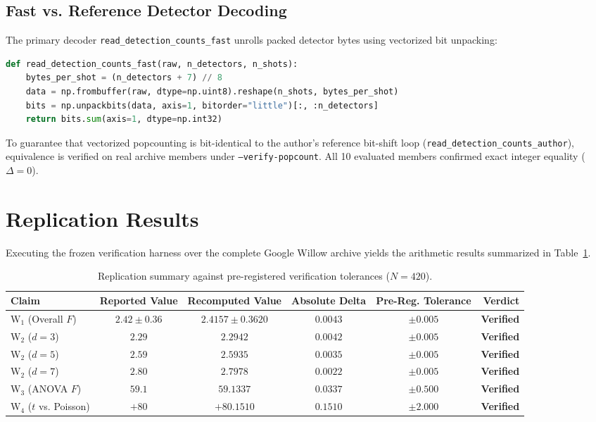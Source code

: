 \documentclass[10pt,a4paper,onecolumn]{article}
\begin{document}
\subsection{Fast vs. Reference Detector Decoding}
The primary decoder \texttt{read\_detection\_counts\_fast} unrolls packed detector bytes using vectorized bit unpacking:
\begin{lstlisting}[language=Python,basicstyle=\ttfamily\footnotesize]
def read_detection_counts_fast(raw, n_detectors, n_shots):
    bytes_per_shot = (n_detectors + 7) // 8
    data = np.frombuffer(raw, dtype=np.uint8).reshape(n_shots, bytes_per_shot)
    bits = np.unpackbits(data, axis=1, bitorder="little")[:, :n_detectors]
    return bits.sum(axis=1, dtype=np.int32)
\end{lstlisting}
To guarantee that vectorized popcounting is bit-identical to the author's reference bit-shift loop (\texttt{read\_detection\_counts\_author}), equivalence is verified on real archive members under \texttt{--verify-popcount}. All 10 evaluated members confirmed exact integer equality ($\Delta = 0$).

\section{Replication Results}

Executing the frozen verification harness over the complete Google Willow archive yields the arithmetic results summarized in Table~\ref{tab:results}.

\begin{table}[htbp]
\centering
\small
\begin{tabular}{lccccr}
\toprule
\textbf{Claim} & \textbf{Reported Value} & \textbf{Recomputed Value} & \textbf{Absolute Delta} & \textbf{Pre-Reg. Tolerance} & \textbf{Verdict} \\
\midrule
$\text{W}_1$ (Overall $F$) & $2.42 \pm 0.36$ & $2.4157 \pm 0.3620$ & $0.0043$ & $\pm 0.005$ & \textbf{Verified} \\
$\text{W}_2$ ($d=3$) & $2.29$ & $2.2942$ & $0.0042$ & $\pm 0.005$ & \textbf{Verified} \\
$\text{W}_2$ ($d=5$) & $2.59$ & $2.5935$ & $0.0035$ & $\pm 0.005$ & \textbf{Verified} \\
$\text{W}_2$ ($d=7$) & $2.80$ & $2.7978$ & $0.0022$ & $\pm 0.005$ & \textbf{Verified} \\
$\text{W}_3$ (ANOVA $F$) & $59.1$ & $59.1337$ & $0.0337$ & $\pm 0.500$ & \textbf{Verified} \\
$\text{W}_4$ ($t$ vs. Poisson) & $+80$ & $+80.1510$ & $0.1510$ & $\pm 2.000$ & \textbf{Verified} \\
\bottomrule
\end{tabular}
\caption{Replication summary against pre-registered verification tolerances ($N=420$).}
\label{tab:results}
\end{table}
\end{document}
